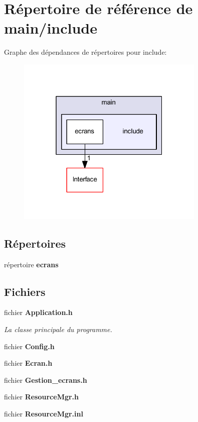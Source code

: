 \section{Répertoire de référence de main/include}
\label{dir_bad007344d42f4b5340fab5412b591e5}
Graphe des dépendances de répertoires pour include\+:\nopagebreak
\begin{figure}[H]
\begin{center}
\leavevmode
\includegraphics[width=254pt]{dir_bad007344d42f4b5340fab5412b591e5_dep}
\end{center}
\end{figure}
\subsection*{Répertoires}
\begin{DoxyCompactItemize}
\item 
répertoire {\bf ecrans}
\end{DoxyCompactItemize}
\subsection*{Fichiers}
\begin{DoxyCompactItemize}
\item 
fichier {\bf Application.\+h}
\begin{DoxyCompactList}\small\item\em La classe principale du programme. \end{DoxyCompactList}\item 
fichier {\bf Config.\+h}
\item 
fichier {\bf Ecran.\+h}
\item 
fichier {\bf Gestion\+\_\+ecrans.\+h}
\item 
fichier {\bf Resource\+Mgr.\+h}
\item 
fichier {\bf Resource\+Mgr.\+inl}
\end{DoxyCompactItemize}
